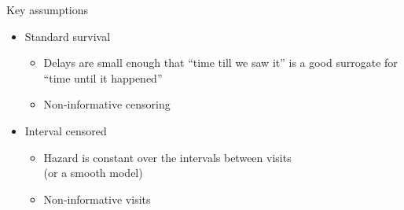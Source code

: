 \begin{frame}{Key assumptions}
  \begin{itemize}
    \item Standard survival
      \begin{itemize}
        \item Delays are small enough that ``time till we saw it'' is a good
          surrogate for ``time until it happened''
        \item Non-informative censoring
      \end{itemize}
    \item Interval censored
      \begin{itemize}
        \item Hazard is constant over the intervals between visits\\
          (or a smooth model)
        \item Non-informative visits
      \end{itemize}
  \end{itemize}
\end{frame}

  
\begin{frame}
\end{frame}

\begin{frame}
\end{frame}

\begin{frame}
\end{frame}

\begin{frame}
\end{frame}

